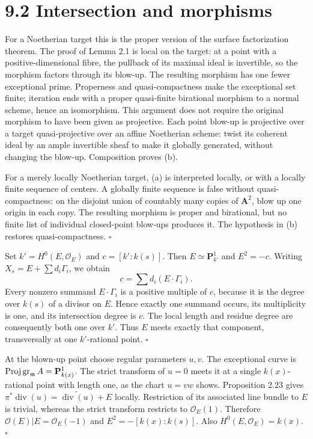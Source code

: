 \documentclass[11pt]{article}
\let\chapterexercise\exercise
\renewcommand{\exercise}[2]{\Needspace{8\baselineskip}\chapterexercise{#1}{#2}}
\begin{document}
\section*{9.2 Intersection and morphisms}

\pf For a Noetherian target this is the proper version of the surface factorization theorem. The proof of Lemma 2.1 is local on the target: at a point with a positive-dimensional fibre, the pullback of its maximal ideal is invertible, so the morphism factors through its blow-up. The resulting morphism has one fewer exceptional prime. Properness and quasi-compactness make the exceptional set finite; iteration ends with a proper quasi-finite birational morphism to a normal scheme, hence an isomorphism. This argument does not require the original morphism to have been given as projective. Each point blow-up is projective over a target quasi-projective over an affine Noetherian scheme: twist its coherent ideal by an ample invertible sheaf to make it globally generated, without changing the blow-up. Composition proves (b).

For a merely locally Noetherian target, (a) is interpreted locally, or with a locally finite sequence of centers. A globally finite sequence is false without quasi-compactness: on the disjoint union of countably many copies of $\mathbf A^2$, blow up one origin in each copy. The resulting morphism is proper and birational, but no finite list of individual closed-point blow-ups produces it. The hypothesis in (b) restores quasi-compactness. \hfill$\square$

\pf Set $k'=H^0(E,\mathcal O_E)$ and $c=[k':k(s)]$. Then $E\simeq\mathbf P^1_{k'}$ and $E^2=-c$. Writing $X_s=E+\sum d_i\Gamma_i$, we obtain
\[ c=\sum d_i(E\cdot\Gamma_i). \]
Every nonzero summand $E\cdot\Gamma_i$ is a positive multiple of $c$, because it is the degree over $k(s)$ of a divisor on $E$. Hence exactly one summand occurs, its multiplicity is one, and its intersection degree is $c$. The local length and residue degree are consequently both one over $k'$. Thus $E$ meets exactly that component, transversally at one $k'$-rational point. \hfill$\square$

\pf At the blown-up point choose regular parameters $u,v$. The exceptional curve is $\operatorname{Proj}\operatorname{gr}_{\mathfrak m}A=\mathbf P^1_{k(x)}$. The strict transform of $u=0$ meets it at a single $k(x)$-rational point with length one, as the chart $u=vw$ shows. Proposition 2.23 gives $\pi^*\operatorname{div}(u)=\widetilde{\operatorname{div}(u)}+E$ locally. Restriction of its associated line bundle to $E$ is trivial, whereas the strict transform restricts to $\mathcal O_E(1)$. Therefore $\mathcal O(E)|E=\mathcal O_E(-1)$ and $E^2=-[k(x):k(s)]$. Also $H^0(E,\mathcal O_E)=k(x)$. \hfill$\square$
\end{document}
